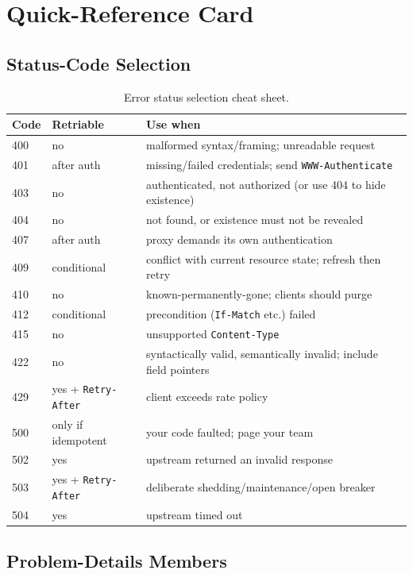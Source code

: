 \section{Quick-Reference Card}

\subsection*{Status-Code Selection}

\begin{table}[h]
  \centering
  \small
  \begin{tabularx}{\textwidth}{l l X}
    \toprule
    \textbf{Code} & \textbf{Retriable} & \textbf{Use when} \\
    \midrule
    400 & no & malformed syntax/framing; unreadable request \\
    401 & after auth & missing/failed credentials; send \texttt{WWW-Authenticate} \\
    403 & no & authenticated, not authorized (or use 404 to hide existence) \\
    404 & no & not found, or existence must not be revealed \\
    407 & after auth & proxy demands its own authentication \\
    409 & conditional & conflict with current resource state; refresh then retry \\
    410 & no & known-permanently-gone; clients should purge \\
    412 & conditional & precondition (\texttt{If-Match} etc.) failed \\
    415 & no & unsupported \texttt{Content-Type} \\
    422 & no & syntactically valid, semantically invalid; include field pointers \\
    429 & yes + \texttt{Retry-After} & client exceeds rate policy \\
    500 & only if idempotent & your code faulted; page your team \\
    502 & yes & upstream returned an invalid response \\
    503 & yes + \texttt{Retry-After} & deliberate shedding/maintenance/open breaker \\
    504 & yes & upstream timed out \\
    \bottomrule
  \end{tabularx}
  \caption{Error status selection cheat sheet.}
\end{table}

\subsection*{Problem-Details Members}

